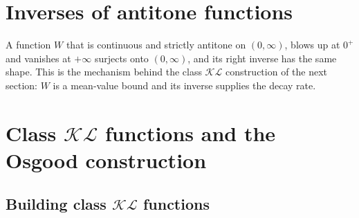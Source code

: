 





\section{Inverses of antitone functions}

A function $W$ that is continuous and strictly antitone on $(0,\infty)$, blows up at $0^+$ and
vanishes at $+\infty$ surjects onto $(0,\infty)$, and its right inverse has the same shape.  This
is the mechanism behind the class $\mathcal{KL}$ construction of the next section: $W$ is a
mean-value bound and its inverse supplies the decay rate.








\section{Class \texorpdfstring{$\mathcal{KL}$}{KL} functions and the Osgood construction}






\subsection{Building class \texorpdfstring{$\mathcal{KL}$}{KL} functions}

